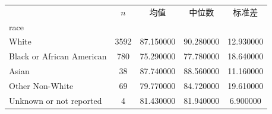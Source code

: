 \begin{tabular}{lcccc}
\toprule
 & $n$ & 均值 & 中位数 & 标准差 \\
race &  &  &  &  \\
\midrule
White & 3592 & 87.150000 & 90.280000 & 12.930000 \\
Black or African American & 780 & 75.290000 & 77.780000 & 18.640000 \\
Asian & 38 & 87.740000 & 88.560000 & 11.160000 \\
Other Non-White & 69 & 79.770000 & 84.720000 & 19.610000 \\
Unknown or not reported & 4 & 81.430000 & 81.940000 & 6.900000 \\
\bottomrule
\end{tabular}
